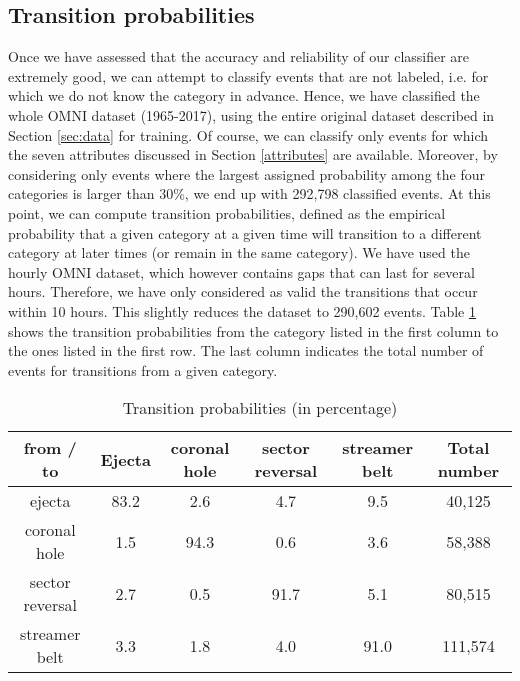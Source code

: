 \documentclass[draft,jgrga]{agutex}
\begin{document}
\begin{article}
\subsection{Transition probabilities} 
Once we have assessed that the accuracy and reliability of our classifier are extremely good, we can attempt to classify events that are not labeled, i.e. for which we do not know the category in advance.
Hence, we have classified the whole OMNI dataset (1965-2017), using the entire original dataset described in Section \ref{sec:data} for training. Of course, we can classify only events for which the seven attributes discussed in Section \ref{attributes} are available. Moreover, by considering only events where the largest assigned probability among the four categories is larger than $30\%$, we end up with 292,798 classified events.
At this point, we can compute transition probabilities, defined as the {empirical} probability that a given category at a given time will transition to a different category at later times (or remain in the same category). We have used the hourly OMNI dataset, which however contains gaps that can last for several hours. Therefore, we have only considered as valid the transitions that occur within 10 hours. This slightly reduces the dataset to 290,602 events. Table \ref{table:transition} shows the transition probabilities from the category listed in the first column to the ones listed in the first row. The last column indicates the total number of events for transitions from a given category.

\begin{table}
\caption{Transition probabilities (in percentage)}\label{table:transition}
\centering
\begin{tabular}{c c c c c c}
\hline
from / to & Ejecta & coronal hole & sector reversal & streamer belt & Total number\\
\hline
ejecta & 83.2 &     2.6 &    4.7 &    9.5 & 40,125\\
coronal hole &    1.5 &   94.3 &    0.6 &    3.6 & 58,388\\
sector reversal &    2.7 &    0.5 &   91.7 &    5.1 & 80,515\\
streamer belt &    3.3 &    1.8 &    4.0 &   91.0 & 111,574\\
\end{tabular}
\end{table}


\end{article}
\end{document}
